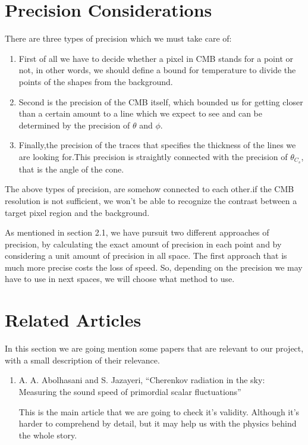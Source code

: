 \documentclass{article}
\begin{document}
\begin{multicols}{2}
\section{Precision Considerations}
There are three types of precision which we must take care of:
\begin{enumerate}
\item
First of all we have to decide whether a pixel in CMB stands for a point or not, in other words, we should define a bound for temperature to divide the points of the shapes from the background.

\item
Second is the precision of the CMB itself, which bounded us for getting closer than a certain amount to a line which we expect to see and can be determined by the precision of $\theta$ and $\phi$.

\item
Finally,the precision of the traces that specifies the thickness of the lines we are looking for.This precision is straightly connected with the precision of $\theta_{C_s}$, that is the angle of the cone.

\end{enumerate}
The above types of precision, are somehow connected to each other.if the CMB resolution is not  sufficient, we won't be able to recognize the contrast between a target pixel region and the background.

As mentioned in section 2.1, we have pursuit two different approaches of precision, by calculating the exact amount of precision in each point and by considering a unit amount of precision in all space. The first approach that is much more precise costs the loss of speed. So, depending on the precision we may have to use in next spaces, we will choose what method to use.

\section{Related Articles}
In this section we are going mention some papers that are relevant to our project, with a small description of their relevance.

\begin{enumerate}
\item
A. A. Abolhasani and S. Jazayeri, “Cherenkov radiation in the sky:  Measuring the sound speed of primordial scalar fluctuations”

This is the main article that we are going to check it's validity. Although it's harder to comprehend by detail, but it may help us with the physics behind the whole story.


\end{enumerate}
\end{multicols}
\end{document}
